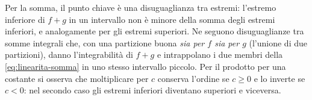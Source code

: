 \begin{schema}
\end{schema}

\begin{strategia}
Per la somma, il punto chiave è una disuguaglianza tra estremi: l'estremo inferiore di
$f+g$ in un intervallo non è minore della somma degli estremi inferiori, e
analogamente per gli estremi superiori. Ne seguono disuguaglianze tra somme integrali
che, con una partizione buona \emph{sia per $f$ sia per $g$} (l'unione di due
partizioni), danno l'integrabilità di $f+g$ e intrappolano i due membri della
\eqref{eq:linearita-somma} in uno stesso intervallo piccolo. Per il prodotto per una
costante si osserva che moltiplicare per $c$ conserva l'ordine se $c\ge0$ e lo inverte
se $c<0$: nel secondo caso gli estremi inferiori diventano superiori e viceversa.
\end{strategia}


